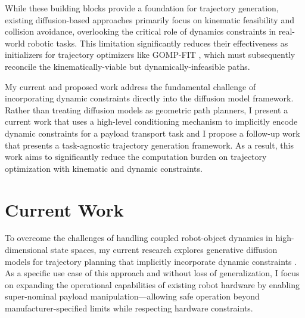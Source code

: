While these building blocks provide a foundation for trajectory generation, existing diffusion-based approaches primarily focus on kinematic feasibility and collision avoidance, overlooking the critical role of dynamics constraints in real-world robotic tasks. This limitation significantly reduces their effectiveness as initializers for trajectory optimizers like GOMP-FIT \cite{ichnowski2022gomp}, which must subsequently reconcile the kinematically-viable but dynamically-infeasible paths.

My current and proposed work address the fundamental challenge of incorporating dynamic constraints directly into the diffusion model framework. Rather than treating diffusion models as geometric path planners, I present a current work that uses a high-level conditioning mechanism to implicitly encode dynamic constraints for a payload transport task and I propose a follow-up work that presents a task-agnostic trajectory generation framework.
As a result, this work aims to significantly reduce the computation burden on trajectory optimization with kinematic and dynamic constraints.

\section{Current Work}



To overcome the challenges of handling coupled robot-object dynamics in high-dimensional state spaces, my current research explores generative diffusion models for trajectory planning that implicitly incorporate dynamic constraints \cite{pasricha2024towards,wang2001payload}.
As a specific use case of this approach and without loss of generalization, I focus on expanding the operational capabilities of existing robot hardware by enabling super-nominal payload manipulation---allowing safe operation beyond manufacturer-specified limits while respecting hardware constraints.

